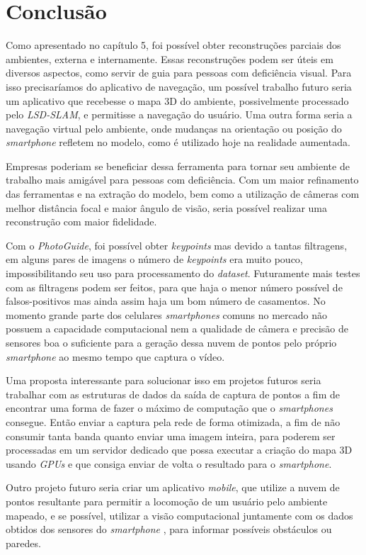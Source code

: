\chapter{Conclusão}
Como apresentado no capítulo 5, foi possível obter reconstruções parciais dos ambientes, externa e internamente. Essas reconstruções podem ser úteis em diversos aspectos, como servir de guia para pessoas com deficiência visual. Para isso precisaríamos do aplicativo de navegação, um possível trabalho futuro seria um aplicativo que recebesse o mapa 3D do ambiente, possivelmente processado pelo \textit{LSD-SLAM}, e permitisse a navegação do usuário. Uma outra forma seria a navegação virtual pelo ambiente, onde mudanças na orientação ou posição do \textit{smartphone} refletem no modelo, como é utilizado hoje na realidade aumentada.

Empresas poderiam se beneficiar dessa ferramenta para tornar seu ambiente de trabalho mais amigável para pessoas com deficiência. Com um maior refinamento das ferramentas e na extração do modelo, bem como a utilização de câmeras com melhor distância focal e maior ângulo de visão, seria possível realizar uma reconstrução com maior fidelidade. 

 Com o \textit{PhotoGuide}, foi possível obter \textit{keypoints} mas devido a tantas filtragens, em alguns pares de imagens o número de \textit{keypoints} era muito pouco, impossibilitando seu uso para processamento do \textit{dataset}. Futuramente mais testes com as filtragens podem ser feitos, para que haja o menor número possível de falsos-positivos mas ainda assim haja um bom número de casamentos. No momento grande parte dos celulares \textit{smartphones} comuns no mercado não possuem a capacidade computacional nem a qualidade de câmera e precisão de sensores boa o suficiente para a geração dessa nuvem de pontos pelo próprio \textit{smartphone} ao mesmo tempo que captura o vídeo. 
 
 Uma proposta interessante para solucionar isso em projetos futuros seria trabalhar com as estruturas de dados da saída de captura de pontos a fim de encontrar uma forma de fazer o máximo de computação que o \textit{smartphones} consegue. Então enviar a captura pela rede de forma otimizada, a fim de não consumir tanta banda quanto enviar uma imagem inteira, para poderem ser processadas em um servidor dedicado que possa executar a criação do mapa 3D usando \textit{GPUs} e que consiga enviar de volta o resultado para o \textit{smartphone}.
	
Outro projeto futuro seria criar um aplicativo \textit{mobile}, que utilize a nuvem de pontos resultante para permitir a locomoção de um usuário pelo ambiente mapeado, e se possível, utilizar a visão computacional juntamente com os dados obtidos dos sensores do \textit{smartphone} , para informar possíveis obstáculos ou paredes.
